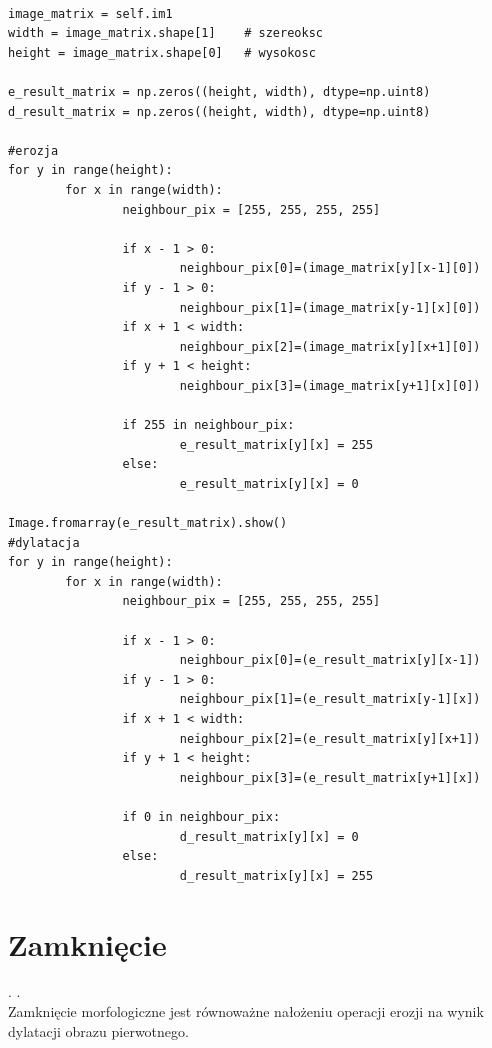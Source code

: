 \documentclass[final,a4paper,openany,12pt]{mwbk}
\begin{document}
\begin{lstlisting}[caption= Operacja otwarcia na obrazie binarnym]

image_matrix = self.im1
width = image_matrix.shape[1]    # szereoksc
height = image_matrix.shape[0]   # wysokosc

e_result_matrix = np.zeros((height, width), dtype=np.uint8)
d_result_matrix = np.zeros((height, width), dtype=np.uint8)

#erozja
for y in range(height):
        for x in range(width):  
                neighbour_pix = [255, 255, 255, 255]

                if x - 1 > 0:
                        neighbour_pix[0]=(image_matrix[y][x-1][0])
                if y - 1 > 0:
                        neighbour_pix[1]=(image_matrix[y-1][x][0])
                if x + 1 < width:
                        neighbour_pix[2]=(image_matrix[y][x+1][0])
                if y + 1 < height:
                        neighbour_pix[3]=(image_matrix[y+1][x][0])

                if 255 in neighbour_pix:
                        e_result_matrix[y][x] = 255
                else:
                        e_result_matrix[y][x] = 0 

Image.fromarray(e_result_matrix).show()
#dylatacja
for y in range(height):
        for x in range(width):  
                neighbour_pix = [255, 255, 255, 255]

                if x - 1 > 0:
                        neighbour_pix[0]=(e_result_matrix[y][x-1])
                if y - 1 > 0:
                        neighbour_pix[1]=(e_result_matrix[y-1][x])
                if x + 1 < width:
                        neighbour_pix[2]=(e_result_matrix[y][x+1])
                if y + 1 < height:
                        neighbour_pix[3]=(e_result_matrix[y+1][x])

                if 0 in neighbour_pix:
                        d_result_matrix[y][x] = 0
                else:
                        d_result_matrix[y][x] = 255   

\end{lstlisting}
\newpage

\section{ Zamknięcie}
.
.\hfill\\
\indent
	Zamknięcie morfologiczne jest równoważne nałożeniu operacji erozji na wynik dylatacji obrazu pierwotnego.
\end{document}
